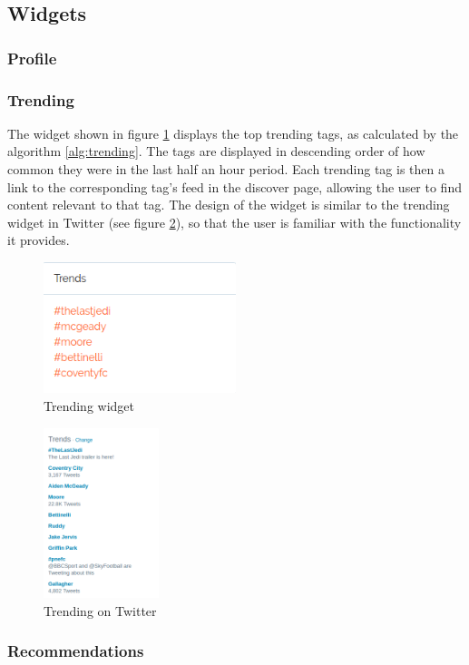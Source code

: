 \subsection{Widgets}

\subsubsection{Profile}

\subsubsection{Trending}
The widget shown in figure \ref{fig:trending} displays the top trending tags, as calculated by the algorithm \ref{alg:trending}. The tags are displayed in descending order of how common they were in the last half an hour period. Each trending tag is then a link to the corresponding tag's feed in the discover page, allowing the user to find content relevant to that tag. The design of the widget is similar to the trending widget in Twitter (see figure \ref{fig:trending-twitter}), so that the user is familiar with the functionality it provides.

\begin{figure}[H]
\centering
\includegraphics[width=0.5\textwidth]{Images/Design/trending-widget}
\caption{Trending widget}
\label{fig:trending}
\end{figure}

\begin{figure}[H]
\centering
\includegraphics[width=0.3\textwidth]{Images/Design/trending-twitter}
\caption{Trending on Twitter}
\label{fig:trending-twitter}
\end{figure}

\subsubsection{Recommendations}